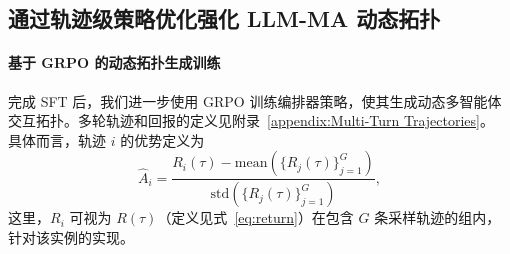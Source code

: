 \documentclass{article}
\theoremstyle{definition}
\begin{document}
\subsection{通过轨迹级策略优化强化 LLM-MA 动态拓扑}
\paragraph{基于 GRPO 的动态拓扑生成训练}
完成 SFT 后，我们进一步使用 GRPO 训练编排器策略，使其生成动态多智能体交互拓扑。多轮轨迹和回报的定义见附录~\ref{appendix:Multi-Turn Trajectories}。
具体而言，轨迹 $i$ 的优势定义为
\begin{equation}\label{eq:grpo_adv}
\hat A_i=\frac{R_i(\tau)-\mathrm{mean}\!\left(\{R_j(\tau)\}_{j=1}^{G}\right)}
               {\mathrm{std}\!\left(\{R_j(\tau)\}_{j=1}^{G}\right)},
\end{equation}
这里，$R_i$ 可视为 $R(\tau)$（定义见式~\ref{eq:return}）在包含 $G$ 条采样轨迹的组内，针对该实例的实现。
\end{document}
